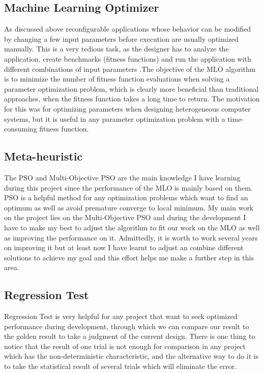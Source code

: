 \documentclass[11pt, runningheads,a4paper]{llncs}
\begin{document}
\subsection{Machine Learning Optimizer}
As discussed above reconfigurable applications whose behavior can be modified by changing a few input parameters before execution are usually optimized manually. This is a very tedious task, as the designer has to analyze the application, create benchmarks (fitness functions) and run the application with different combinations of input parameters .The objective of the MLO algorithm is to minimize the number of fitness function evaluations when solving a parameter optimization problem, which is clearly more beneficial than traditional approaches, when the fitness function takes a long time to return. The motivation for this was for optimizing parameters when designing heterogeneous computer systems, but it is useful in any parameter optimization problem with a time-consuming fitness function.

\subsection{Meta-heuristic}
The PSO and Multi-Objective PSO are the main knowledge I have learning during this project since the performance of the MLO is mainly based on them. PSO is a helpful method for any optimization problems which want to find an optimum as well as avoid premature converge to local minimum. My main work on the project lies on the Multi-Objective PSO and during the development I have to make my best to adjust the algorithm to fit our work on the MLO as well as improving the performance on it. Admittedly, it is worth to work several years on improving it but at least now I have learnt to adjust an combine different solutions to achieve my goal and this effort helps me make a further step in this area.

\subsection{Regression Test}
Regression Test is very helpful for any project that want to seek optimized performance during development, through which we can compare our result to the golden result to take a judgment of the current design. There is one thing to notice that the result of one trial is not enough for comparison in any project which has the non-deterministic characteristic, and the alternative way to do it is to take the statistical result of several trials which will eliminate the error.
\end{document}

